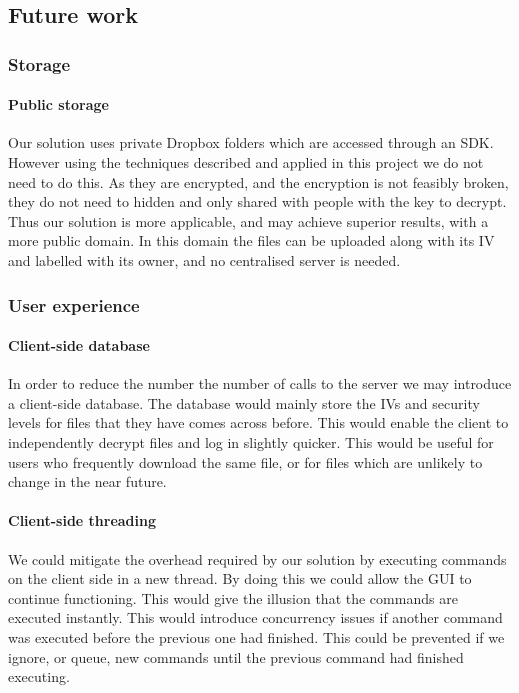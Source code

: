 \documentclass[12pt, titlepage]{article}
\begin{document}
\subsection{Future work}
\subsubsection*{Storage}
\paragraph*{Public storage} Our solution uses private Dropbox folders which are accessed through an SDK. However using the techniques described and applied in this project we do not need to do this. As they are encrypted, and the encryption is not feasibly broken, they do not need to hidden and only shared with people with the key to decrypt. Thus our solution is more applicable, and may achieve superior results, with a more public domain. In this domain the files can be uploaded along with its IV and labelled with its owner, and no centralised server is needed.
\subsubsection*{User experience}
\paragraph*{Client-side database} In order to reduce the number the number of calls to the server we may introduce a client-side database. The database would mainly store the IVs and security levels for files that they have comes across before. This would enable the client to independently decrypt files and log in slightly quicker. This would be useful for users who frequently download the same file, or for files which are unlikely to change in the near future.
\paragraph*{Client-side threading} We could mitigate the overhead required by our solution by executing commands on the client side in a new thread. By doing this we could allow the GUI to continue functioning. This would give the illusion that the commands are executed instantly. This would introduce concurrency issues if another command was executed before the previous one had finished. This could be prevented if we ignore, or queue, new commands until the previous command had finished executing. 
\end{document}
